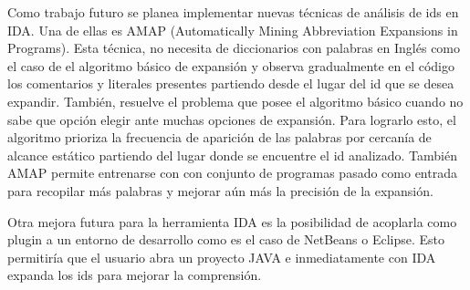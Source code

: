 \documentclass[a4paper,12pt]{report}
\begin{document}
Como trabajo futuro se planea implementar nuevas técnicas de análisis de ids en IDA. Una de ellas es AMAP (Automatically Mining Abbreviation Expansions in Programs). Esta técnica, no necesita de diccionarios con palabras en Inglés como el caso de el algoritmo básico de expansión y observa gradualmente en el código los comentarios y literales presentes partiendo desde el lugar del id que se desea expandir. También, resuelve el problema que posee el algoritmo básico cuando no sabe que opción elegir ante muchas opciones de expansión. Para lograrlo esto, el algoritmo prioriza la frecuencia de aparición de las palabras por cercanía de alcance estático partiendo del lugar donde se encuentre el id analizado. También AMAP permite entrenarse con con conjunto de programas pasado como entrada para recopilar más palabras y mejorar aún más la precisión de la expansión.

Otra mejora futura para la herramienta IDA es la posibilidad de acoplarla como plugin a un entorno de desarrollo como es el caso de NetBeans o Eclipse. Esto permitiría que el usuario abra un proyecto JAVA e inmediatamente con IDA expanda los ids para mejorar la comprensión.






\end{document}
